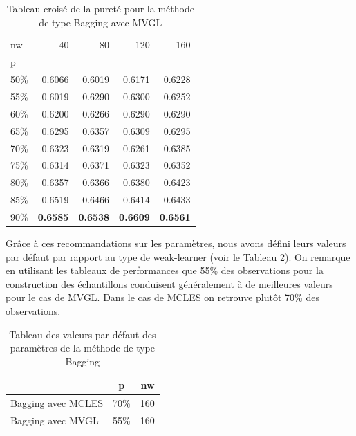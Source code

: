 	\begin{table}[h!]
  		 \caption{Tableau croisé de la pureté pour la méthode de type Bagging avec MVGL}
  		 \centering
    	\begin{tabular}{lrrrr}
    	\toprule
    	nw & 40 & 80 & 120 & 160 \\
    	p &  &  &  &  \\
    	\midrule
    	50\% & 0.6066 & 0.6019 & 0.6171 & 0.6228 \\
    	55\% & 0.6019 & 0.6290 & 0.6300 & 0.6252 \\
    	60\% & 0.6200 & 0.6266 & 0.6290 & 0.6290 \\
    	65\% & 0.6295 & 0.6357 & 0.6309 & 0.6295 \\
    	70\% & 0.6323 & 0.6319 & 0.6261 & 0.6385 \\
    	75\% & 0.6314 & 0.6371 & 0.6323 & 0.6352 \\
    	80\% & 0.6357 & 0.6366 & 0.6380 & 0.6423 \\
    	85\% & 0.6519 & 0.6466 & 0.6414 & 0.6433 \\
    	90\% & \textbf{0.6585} & \textbf{0.6538} & \textbf{0.6609} & \textbf{0.6561} \\
    	\bottomrule
    	\end{tabular}
  		 \label{table:pur_mvgl}
	\end{table}

	Grâce à ces recommandations sur les paramètres, nous avons défini leurs valeurs par défaut par rapport au type de weak-learner (voir le Tableau \ref{table:default}). On remarque en utilisant les tableaux de performances que 55\% des observations pour la construction des échantillons conduisent généralement à de meilleures valeurs pour le cas de MVGL. Dans le cas de MCLES on retrouve plutôt 70\% des observations.
 
	\begin{table}[h!]
  		 \caption{Tableau des valeurs par défaut des paramètres de la méthode de type Bagging}
  		 \centering
  		 \begin{tabular}{lcr}
  			 \toprule
			& p & nw \\
  			 \midrule
  			 Bagging avec MCLES & 70\% & 160 \\
  			 Bagging avec MVGL & 55\% & 160 \\
  			 \bottomrule
  			 \end{tabular}
  		 \label{table:default}
	\end{table}

